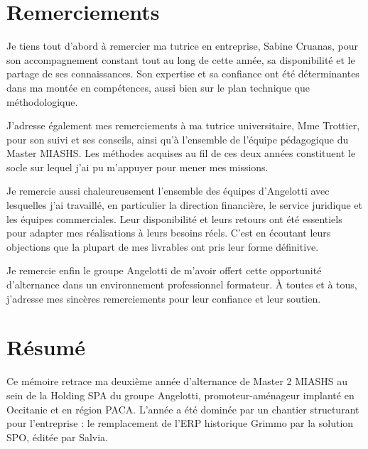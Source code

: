 
\section*{Remerciements}

Je tiens tout d'abord à remercier ma tutrice en entreprise, Sabine Cruanas, pour son
accompagnement constant tout au long de cette année, sa disponibilité et le partage de ses
connaissances. Son expertise et sa confiance ont été déterminantes dans ma montée en
compétences, aussi bien sur le plan technique que méthodologique.

J'adresse également mes remerciements à ma tutrice universitaire, Mme Trottier, pour son suivi
et ses conseils, ainsi qu'à l'ensemble de l'équipe pédagogique du Master MIASHS. Les méthodes
acquises au fil de ces deux années constituent le socle sur lequel j'ai pu m'appuyer pour mener
mes missions.

Je remercie aussi chaleureusement l'ensemble des équipes d'Angelotti avec lesquelles j'ai
travaillé, en particulier la direction financière, le service juridique et les équipes
commerciales. Leur disponibilité et leurs retours ont été essentiels pour adapter mes
réalisations à leurs besoins réels. C'est en écoutant leurs objections que la plupart de mes
livrables ont pris leur forme définitive.

Je remercie enfin le groupe Angelotti de m'avoir offert cette opportunité d'alternance dans un
environnement professionnel formateur. À toutes et à tous, j'adresse mes sincères remerciements
pour leur confiance et leur soutien.

\clearpage
\section*{Résumé}

Ce mémoire retrace ma deuxième année d'alternance de Master 2 MIASHS au sein de la Holding SPA
du groupe Angelotti, promoteur-aménageur implanté en Occitanie et en région PACA. L'année a été
dominée par un chantier structurant pour l'entreprise : le remplacement de l'ERP historique
Grimmo par la solution SPO, éditée par Salvia.

